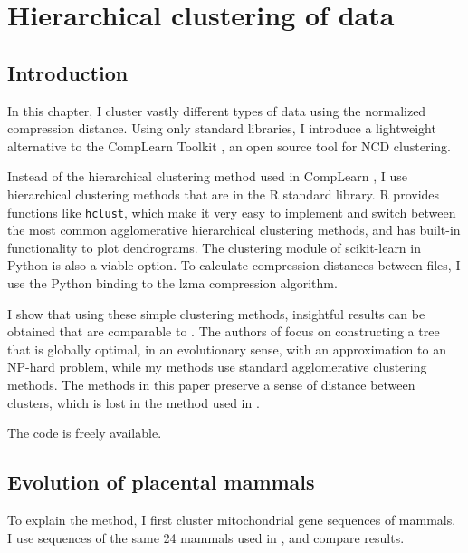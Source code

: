 
\chapter{Hierarchical clustering of data}

\label{Chapter3} %


\section{Introduction}

In this chapter, I cluster vastly different types of data using the
normalized compression distance. Using only standard libraries, I introduce a lightweight alternative to the CompLearn Toolkit \cite{CompLearn}, an open source tool for NCD clustering.

Instead of the hierarchical clustering method used in CompLearn
  \cite{Cilibrasi2011}, I use hierarchical clustering methods that are in the R standard
library. R provides functions like \lstinline{hclust}, which make it very easy to implement and switch between the most common agglomerative hierarchical clustering methods, and has built-in functionality to plot dendrograms. The clustering module of scikit-learn \cite{Pedregosa2011} in Python is also a viable option. To calculate compression distances between files, I use the Python binding to the lzma compression algorithm.

I show that using these simple clustering methods, insightful results can be obtained that are comparable to \cite{Cilibrasi2005}. The authors of \cite{Cilibrasi2005} focus on constructing a tree that is globally optimal, in an evolutionary sense, with an approximation to an NP-hard problem, while my methods use standard agglomerative clustering methods. The methods in this paper preserve a sense of distance between clusters, which is lost in the method used in \cite{Cilibrasi2011}.

The code \cite{ClusteringGithub} is freely available.

\section{Evolution of placental mammals}

To explain the method, I first cluster mitochondrial gene sequences of
mammals. I use sequences of the same 24 mammals used in \cite{Cilibrasi2005}, and compare results.

